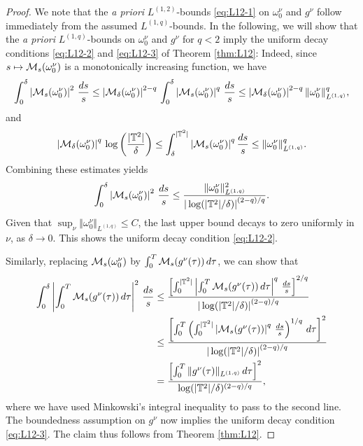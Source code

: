 \documentclass[reqno,12pt]{amsart}
\begin{document}
\begin{proof}

  We note that the {\it a priori} $L^{(1,2)}$-bounds \eqref{eq:L12-1} on $\omega^\nu_0$ and $g^\nu$ follow immediately from the assumed $L^{(1,q)}$-bounds. In the following, we will show that the {\it a priori} $L^{(1,q)}$-bounds on $\omega_0^\nu$ and $g^\nu$ for $q<2$ imply the uniform decay conditions \eqref{eq:L12-2} and \eqref{eq:L12-3} of Theorem \ref{thm:L12}: Indeed, since $s\mapsto \mathcal{M}_s(\omega^\nu_0)$ is a monotonically increasing function, we have
  \[
  \int_0^\delta \left| \mathcal{M}_s(\omega^\nu_0) \right|^2 \, \frac{ds}{s}
  \le
  \left| \mathcal{M}_\delta(\omega^\nu_0)\right|^{2-q} \, \int_0^\delta \left| \mathcal{M}_s(\omega^\nu_0)\right|^q \, \frac{ds}{s}
  \le
  \left|\mathcal{M}_\delta(\omega^\nu_0)\right|^{2-q} \Vert \omega^\nu_0 \Vert^{q}_{L^{(1,q)}},
  \]
  and
  \[
  \left|\mathcal{M}_\delta(\omega^\nu_0)\right|^q \, \log\left(\frac{|\mathbb{T}^2|}{\delta}\right) \le \int_\delta^{|\mathbb{T}^2|} \left|\mathcal{M}_s(\omega^\nu_0)\right|^q \frac{ds}{s} \le \Vert \omega^\nu_0 \Vert_{L^{(1,q)}}^q.
  \]
  Combining these estimates yields
  \[
  \int_0^\delta \left|\mathcal{M}_s(\omega^\nu_0)\right|^2 \, \frac{ds}{s}
  \le
  \frac{\Vert \omega^\nu_0 \Vert_{L^{(1,q)}}^2}{\left| \,\log(|\mathbb{T}^2|/\delta)\right|^{(2-q)/q}}.
  \]
  Given that $\sup_\nu \Vert \omega^\nu_0 \Vert_{L^{(1,q)}} \le C$, the last upper bound decays to zero uniformly in $\nu$, as $\delta \to 0$. This shows the uniform decay condition \eqref{eq:L12-2}.

  Similarly, replacing $\mathcal{M}_s(\omega^\nu_0)$ by $\int_0^T \mathcal{M}_s(g^\nu(\tau)) \, d\tau$, we can show that
  \begin{align*}
  \int_0^\delta \left| \int_0^T \mathcal{M}_s(g^\nu(\tau)) \, d\tau\right|^{2}\, \frac{ds}{s}
  &\le
  \frac{\left[\int_{0}^{|\mathbb{T}^2|} \left| \int_0^T \mathcal{M}_s(g^\nu(\tau)) \, d\tau \right|^q \, \frac{ds}{s}\right]^{2/q}}{\left|\,\log(|\mathbb{T}^2|/\delta)\right|^{(2-q)/q}}
  \\
  &\le
  \frac{\left[\int_0^T \left( \int_{0}^{|\mathbb{T}^2|} \left|\mathcal{M}_s(g^\nu(\tau))\right|^q \,
  \frac{ds}{s} \right)^{1/q} \, d\tau\right]^2 }{\left|\,\log(|\mathbb{T}^2|/\delta)\right|^{(2-q)/q}}
  \\
  &=
  \frac{\left[\int_0^T \Vert g^\nu(\tau) \Vert_{L^{(1,q)}} \, d\tau\right]^2 }{\log(|\mathbb{T}^2|/\delta)^{(2-q)/q}},
  \end{align*}
  where we have used Minkowski's integral inequality to pass to the second line. The boundedness assumption on $g^\nu$ now implies the uniform decay condition \eqref{eq:L12-3}. The claim thus follows from Theorem \ref{thm:L12}.
\end{proof}
\end{document}
